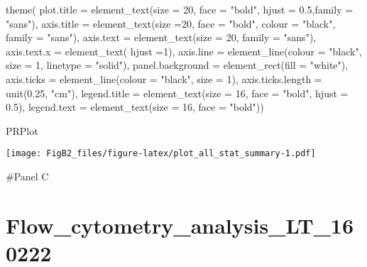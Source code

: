 \documentclass[
]{article}
\newenvironment{Shaded}{\begin{snugshade}}{\end{snugshade}}
\newcommand{\AttributeTok}[1]{\textcolor[rgb]{0.77,0.63,0.00}{#1}}
\newcommand{\DecValTok}[1]{\textcolor[rgb]{0.00,0.00,0.81}{#1}}
\newcommand{\FloatTok}[1]{\textcolor[rgb]{0.00,0.00,0.81}{#1}}
\newcommand{\FunctionTok}[1]{\textcolor[rgb]{0.00,0.00,0.00}{#1}}
\newcommand{\NormalTok}[1]{#1}
\newcommand{\StringTok}[1]{\textcolor[rgb]{0.31,0.60,0.02}{#1}}
\begin{document}
\begin{Shaded}
\begin{Highlighting}[]
       \FunctionTok{theme}\NormalTok{(}
    \AttributeTok{plot.title =} \FunctionTok{element\_text}\NormalTok{(}\AttributeTok{size =} \DecValTok{20}\NormalTok{, }\AttributeTok{face =} \StringTok{"bold"}\NormalTok{, }\AttributeTok{hjust =} \FloatTok{0.5}\NormalTok{,}\AttributeTok{family =} \StringTok{"sans"}\NormalTok{),}
    \AttributeTok{axis.title =} \FunctionTok{element\_text}\NormalTok{(}\AttributeTok{size =}\DecValTok{20}\NormalTok{, }\AttributeTok{face =} \StringTok{"bold"}\NormalTok{, }\AttributeTok{colour =} \StringTok{"black"}\NormalTok{, }\AttributeTok{family =} \StringTok{"sans"}\NormalTok{),}
    \AttributeTok{axis.text =} \FunctionTok{element\_text}\NormalTok{(}\AttributeTok{size =} \DecValTok{20}\NormalTok{, }\AttributeTok{family =} \StringTok{"sans"}\NormalTok{),}
    \AttributeTok{axis.text.x =} \FunctionTok{element\_text}\NormalTok{( }\AttributeTok{hjust =}\DecValTok{1}\NormalTok{),}
    \AttributeTok{axis.line =} \FunctionTok{element\_line}\NormalTok{(}\AttributeTok{colour =} \StringTok{"black"}\NormalTok{, }\AttributeTok{size =} \DecValTok{1}\NormalTok{, }\AttributeTok{linetype =} \StringTok{"solid"}\NormalTok{),}
    \AttributeTok{panel.background =} \FunctionTok{element\_rect}\NormalTok{(}\AttributeTok{fill =} \StringTok{"white"}\NormalTok{), }
    \AttributeTok{axis.ticks =} \FunctionTok{element\_line}\NormalTok{(}\AttributeTok{colour =} \StringTok{"black"}\NormalTok{, }\AttributeTok{size =} \DecValTok{1}\NormalTok{),}
    \AttributeTok{axis.ticks.length =} \FunctionTok{unit}\NormalTok{(}\FloatTok{0.25}\NormalTok{, }\StringTok{"cm"}\NormalTok{),}
    \AttributeTok{legend.title =} \FunctionTok{element\_text}\NormalTok{(}\AttributeTok{size =} \DecValTok{16}\NormalTok{, }\AttributeTok{face =} \StringTok{"bold"}\NormalTok{, }\AttributeTok{hjust =} \FloatTok{0.5}\NormalTok{),}
    \AttributeTok{legend.text =} \FunctionTok{element\_text}\NormalTok{(}\AttributeTok{size =} \DecValTok{16}\NormalTok{, }\AttributeTok{face =} \StringTok{"bold"}\NormalTok{))}
    
\NormalTok{PRPlot}
\end{Highlighting}
\end{Shaded}

\texttt{[image: FigB2\_files/figure-latex/plot\_all\_stat\_summary-1.pdf]}

\#Panel C

\hypertarget{flow_cytometry_analysis_lt_160222}{%
\section{Flow\_cytometry\_analysis\_LT\_160222}\label{flow_cytometry_analysis_lt_160222}}
\end{document}
